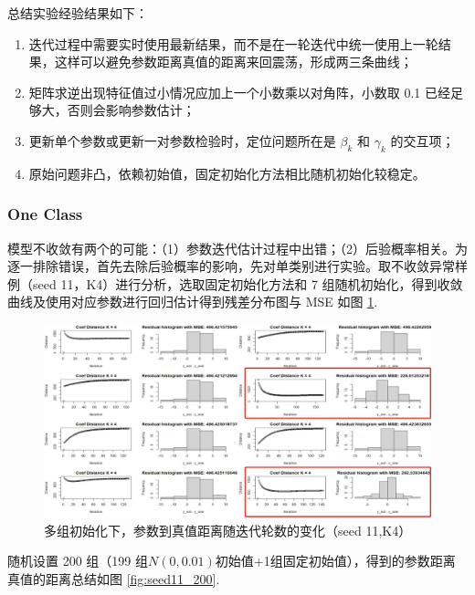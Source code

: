 \documentclass[12pt, a4paper, oneside]{article}
\numberwithin{equation}{section}
\begin{document}
总结实验经验结果如下：
\begin{enumerate}
	\item 迭代过程中需要实时使用最新结果，而不是在一轮迭代中统一使用上一轮结果，这样可以避免参数距离真值的距离来回震荡，形成两三条曲线；
	\item 矩阵求逆出现特征值过小情况应加上一个小数乘以对角阵，小数取 0.1 已经足够大，否则会影响参数估计；
	\item 更新单个参数或更新一对参数检验时，定位问题所在是 $\beta_k$ 和 $\gamma_k$ 的交互项；
	\item 原始问题非凸，依赖初始值，固定初始化方法相比随机初始化较稳定。
\end{enumerate}

\subsubsection{One Class}

模型不收敛有两个的可能：（1）参数迭代估计过程中出错；（2）后验概率相关。为逐一排除错误，首先去除后验概率的影响，先对单类别进行实验。取不收敛异常样例（seed 11，K4）进行分析，选取固定初始化方法和 7 组随机初始化，得到收敛曲线及使用对应参数进行回归估计得到残差分布图与 MSE 如图 \ref{fig:seed11k4_seeds}.

\begin{figure}
	\centering
	\includegraphics[width=\textwidth]{img/seed11k4_seeds.jpg}
	\caption{多组初始化下，参数到真值距离随迭代轮数的变化（seed 11,K4）}
	\label{fig:seed11k4_seeds}
\end{figure}

随机设置 200 组（199 组$N(0,0.01)$初始值+1组固定初始值），得到的参数距离真值的距离总结如图 \ref{fig:seed11_200}.
\end{document}
